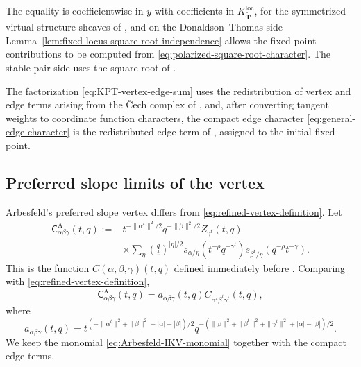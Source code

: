 \documentclass{amsart}
\theoremstyle{definition}
\numberwithin{equation}{section}
\begin{document}
The equality is coefficientwise in \(y\) with coefficients in \(K_{\widetilde{\mathbf T}}^{\mathrm{loc}}\), for the symmetrized virtual structure sheaves of \cite{KuhnLiuThimm}, and on the Donaldson--Thomas side Lemma~\ref{lem:fixed-locus-square-root-independence} allows the fixed point contributions to be computed from \eqref{eq:polarized-square-root-character}.  The stable pair side uses the square root of \cite[Lemma~3.3.7]{KuhnLiuThimm}.

The factorization \eqref{eq:KPT-vertex-edge-sum} uses the redistribution of vertex and edge terms arising from the \v Cech complex of \cite[Section~3.3]{KuhnLiuThimm}, and, after converting tangent weights to coordinate function characters, the compact edge character \eqref{eq:general-edge-character} is the redistributed edge term of \cite[equation~(4.8)]{Arbesfeld}, assigned to the initial fixed point.

\subsection{Preferred slope limits of the vertex}
Arbesfeld's preferred slope vertex differs from \eqref{eq:refined-vertex-definition}.  Let
\begin{equation}
\begin{aligned}
 \mathsf C^{\mathrm A}_{\alpha\beta\gamma}(t,q)
 :={}&t^{-\|\alpha^t\|^2/2}q^{-\|\beta\|^2/2}
 \widetilde Z_{\gamma^t}(t,q)\\
 &\times\sum_\eta\left(\frac qt\right)^{|\eta|/2}
 s_{\alpha/\eta}(t^{-\rho}q^{-\gamma^t})
 s_{\beta^t/\eta}(q^{-\rho}t^{-\gamma}).
\end{aligned}
\label{eq:Arbesfeld-vertex}
\end{equation}
This is the function \(C(\alpha,\beta,\gamma)(t,q)\) defined immediately before \cite[Proposition~4.6]{Arbesfeld}.  Comparing with \eqref{eq:refined-vertex-definition},
\begin{equation}
 \mathsf C^{\mathrm A}_{\alpha\beta\gamma}(t,q)
 =a_{\alpha\beta\gamma}(t,q)
  C_{\alpha^t\beta^t\gamma^t}(t,q),
\label{eq:Arbesfeld-IKV-prefactor}
\end{equation}
where
\begin{equation}
 a_{\alpha\beta\gamma}(t,q)
 =t^{(-\|\alpha^t\|^2+\|\beta\|^2+|\alpha|-|\beta|)/2}
  q^{-(\|\beta\|^2+\|\beta^t\|^2+\|\gamma^t\|^2
       +|\alpha|-|\beta|)/2}.
\label{eq:Arbesfeld-IKV-monomial}
\end{equation}
We keep the monomial \eqref{eq:Arbesfeld-IKV-monomial} together with the compact edge terms.
\end{document}
